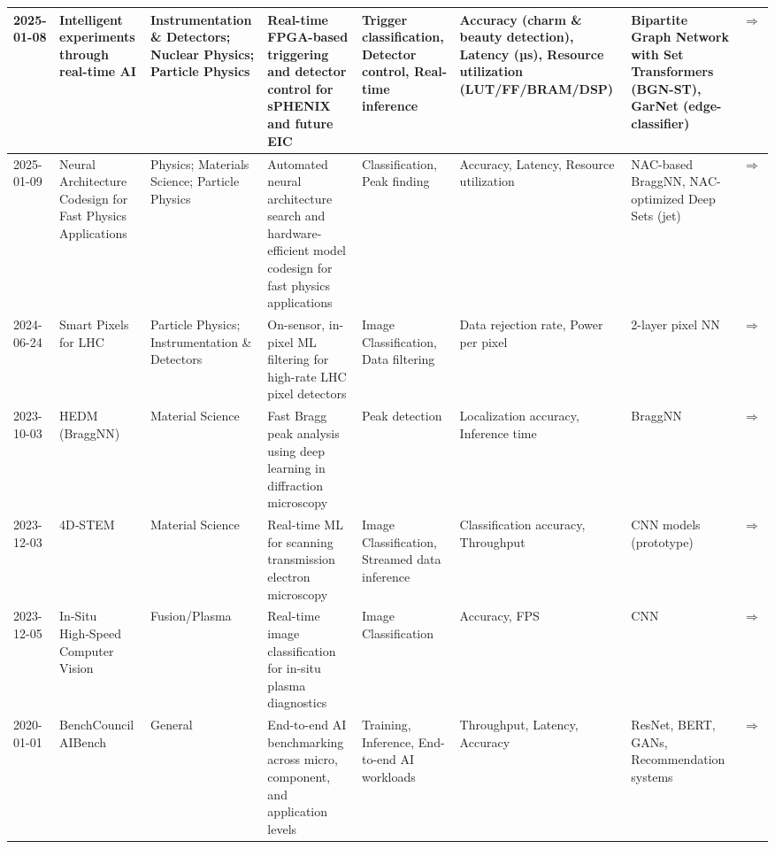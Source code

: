 \documentclass{article}
\begin{document}
\begin{landscape}
{\begin{longtable}{|p{1.5cm}|p{2.5cm}|p{2cm}|p{2cm}|p{3cm}|p{2cm}|p{2cm}|p{1cm}|}
2025-01-08 & Intelligent experiments through real-time AI & Instrumentation \& Detectors; Nuclear Physics; Particle Physics & Real-time FPGA-based triggering and detector control for sPHENIX and future EIC & Trigger classification, Detector control, Real-time inference & Accuracy (charm \& beauty detection), Latency (µs), Resource utilization (LUT/FF/BRAM/DSP) & Bipartite Graph Network with Set Transformers (BGN-ST), GarNet (edge-classifier) & \cite{kvapil2025intelligent} \href{https://arxiv.org/abs/2501.04845}{$\Rightarrow$ } \\ \hline
2025-01-09 & Neural Architecture Codesign for Fast Physics Applications & Physics; Materials Science; Particle Physics & Automated neural architecture search and hardware-efficient model codesign for fast physics applications & Classification, Peak finding & Accuracy, Latency, Resource utilization & NAC-based BraggNN, NAC-optimized Deep Sets (jet) & \cite{weitz2025nacph} \href{https://arxiv.org/abs/2501.05515}{$\Rightarrow$ } \\ \hline
2024-06-24 & Smart Pixels for LHC & Particle Physics; Instrumentation \& Detectors & On-sensor, in-pixel ML filtering for high-rate LHC pixel detectors & Image Classification, Data filtering & Data rejection rate, Power per pixel & 2-layer pixel NN & \cite{parpillon2024smartpixels} \href{https://arxiv.org/abs/2406.14860}{$\Rightarrow$ } \\ \hline
2023-10-03 & HEDM (BraggNN) & Material Science & Fast Bragg peak analysis using deep learning in diffraction microscopy & Peak detection & Localization accuracy, Inference time & BraggNN & \cite{xiao2020braggnn} \href{https://arxiv.org/abs/2008.08198}{$\Rightarrow$ } \\ \hline
2023-12-03 & 4D‑STEM & Material Science & Real-time ML for scanning transmission electron microscopy & Image Classification, Streamed data inference & Classification accuracy, Throughput & CNN models (prototype) & \cite{anonymous2023_4dstem} \href{https://openreview.net/pdf?id=7yt3N0o0W9}{$\Rightarrow$ } \\ \hline
2023-12-05 & In‑Situ High‑Speed Computer Vision & Fusion/Plasma & Real-time image classification for in-situ plasma diagnostics & Image Classification & Accuracy, FPS & CNN & \cite{smith2023insitu} \href{https://arxiv.org/abs/2312.00128}{$\Rightarrow$ } \\ \hline
2020-01-01 & BenchCouncil AIBench & General & End-to-end AI benchmarking across micro, component, and application levels & Training, Inference, End-to-end AI workloads & Throughput, Latency, Accuracy & ResNet, BERT, GANs, Recommendation systems & \cite{gao2020aibench} \href{https://arxiv.org/abs/1908.08998}{$\Rightarrow$ } \\ \hline

\end{longtable}}
\end{landscape}
\end{document}
